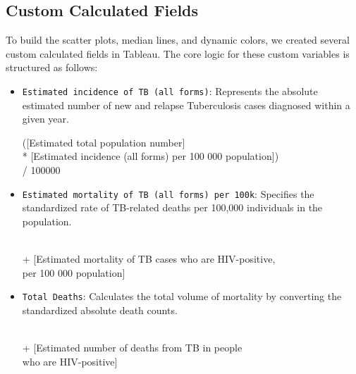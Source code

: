\documentclass[a4paper,12pt]{extarticle}
\begin{document}
\subsection{Custom Calculated Fields}
To build the scatter plots, median lines, and dynamic colors, we created several custom calculated fields in Tableau. The core logic for these custom variables is structured as follows:

\begin{itemize}
    \item \texttt{Estimated incidence of TB (all forms)}: Represents the absolute estimated number of new and relapse Tuberculosis cases diagnosed within a given year.
    \begin{center}
    \begin{tcolorbox}[colback=white, colframe=lightblue, width=\linewidth, fontupper=\footnotesize\ttfamily, arc=3pt]
    ([Estimated total population number] \\
    \hspace*{1em} * [Estimated incidence (all forms) per 100 000 population]) \\
    / 100000
    \end{tcolorbox}
    \end{center}

    \item \texttt{Estimated mortality of TB (all forms) per 100k}: Specifies the standardized rate of TB-related deaths per 100,000 individuals in the population.
    \begin{center}
    \begin{tcolorbox} \\
    + [Estimated mortality of TB cases who are HIV-positive, \\
    \hspace*{1em} per 100 000 population]
    \end{tcolorbox}
    \end{center}

    \item \texttt{Total Deaths}: Calculates the total volume of mortality by converting the standardized absolute death counts.
    \begin{center}
    \begin{tcolorbox} \\
    + [Estimated number of deaths from TB in people \\
    \hspace*{1em} who are HIV-positive]
    \end{tcolorbox}
    \end{center}


\end{itemize}
\end{document}
